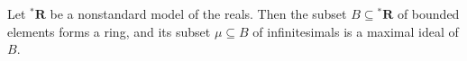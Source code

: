 Let ${^*\mathbf{R}}$ be a nonstandard model of the reals. Then the subset $B \subseteq {^*\mathbf{R}}$ of bounded elements forms a ring, and its subset $\mu \subseteq B$ of infinitesimals is a maximal ideal of $B$.
